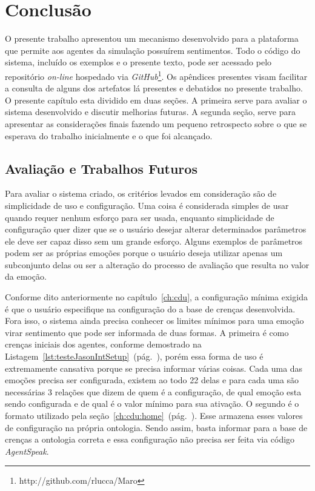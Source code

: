 \chapter{Conclusão} \label{ch:cf}

O presente trabalho apresentou um mecanismo desenvolvido para a plataforma
\jason que permite aos agentes da simulação possuírem sentimentos. Todo o
código do sistema, incluído os exemplos e o presente texto, pode ser acessado
pelo repositório \emph{on-line} hospedado via
\emph{GitHub}\footnote{http://github.com/rlucca/Maro}.
Os apêndices presentes visam facilitar a consulta de alguns dos artefatos lá
presentes e debatidos no presente trabalho.
O presente capítulo esta dividido em duas seções. A primeira serve para
avaliar o sistema desenvolvido e discutir melhorias futuras. A segunda seção,
serve para apresentar as considerações finais fazendo um pequeno retrospecto
sobre o que se esperava do trabalho inicialmente e o que foi alcançado.


\section{Avaliação e Trabalhos Futuros}

Para avaliar o sistema criado, os critérios levados em consideração são de
simplicidade de uso e configuração. Uma coisa é considerada simples de usar
quando requer nenhum esforço para ser usada, enquanto simplicidade de
configuração quer dizer que se o usuário desejar alterar determinados
parâmetros ele deve ser capaz disso sem um grande esforço. Alguns exemplos de
parâmetros podem ser as próprias emoções porque o usuário deseja utilizar
apenas um subconjunto delas ou ser a alteração do processo de avaliação que
resulta no valor da emoção.

Conforme dito anteriormente no capítulo~\ref{ch:cdu}, a configuração mínima
exigida é que o usuário especifique na configuração do \jason a base de
crenças desenvolvida. Fora isso, o sistema ainda precisa conhecer os limites
mínimos para uma emoção virar sentimento que pode ser informada de duas
formas. A primeira é como crenças iniciais dos agentes, conforme demostrado na
Listagem~\ref{lst:testeJasonIntSetup}~(pág.~\pageref{lst:testeJasonIntSetup}),
porém essa forma de uso é extremamente cansativa porque se precisa informar
várias coisas. Cada uma das emoções precisa ser configurada, existem ao todo
22 delas e para cada uma são necessárias 3 relações que dizem de quem é a
configuração, de qual emoção esta sendo configurada e de qual é o valor mínimo
para sua ativação. O segundo é o formato utilizado pela
seção~\ref{ch:cdu:home}~(pág.~\pageref{ch:cdu:home}). Esse armazena esses
valores de configuração na própria ontologia. Sendo assim, basta informar para
a base de crenças a ontologia correta e essa configuração não precisa ser
feita via código \emph{AgentSpeak}.

